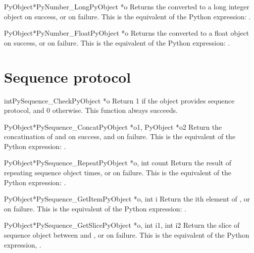 \begin{cfuncdesc}{PyObject*}{PyNumber_Long}{PyObject *o}
Returns the  converted to a long integer object on success,
or \NULL{} on failure.  This is the equivalent of the Python
expression: .
\end{cfuncdesc}


\begin{cfuncdesc}{PyObject*}{PyNumber_Float}{PyObject *o}
Returns the  converted to a float object on success, or \NULL{}
on failure.  This is the equivalent of the Python expression:
.
\end{cfuncdesc}


\section{Sequence protocol}

\begin{cfuncdesc}{int}{PySequence_Check}{PyObject *o}
Return 1 if the object provides sequence protocol, and 0
otherwise.  
This function always succeeds.
\end{cfuncdesc}


\begin{cfuncdesc}{PyObject*}{PySequence_Concat}{PyObject *o1, PyObject *o2}
Return the concatination of  and  on success, and \NULL{} on
failure.   This is the equivalent of the Python
expression: .
\end{cfuncdesc}


\begin{cfuncdesc}{PyObject*}{PySequence_Repeat}{PyObject *o, int count}
Return the result of repeating sequence object   times,
or \NULL{} on failure.  This is the equivalent of the Python
expression: .
\end{cfuncdesc}


\begin{cfuncdesc}{PyObject*}{PySequence_GetItem}{PyObject *o, int i}
Return the ith element of , or \NULL{} on failure. This is the
equivalent of the Python expression: .
\end{cfuncdesc}


\begin{cfuncdesc}{PyObject*}{PySequence_GetSlice}{PyObject *o, int i1, int i2}
Return the slice of sequence object  between  and , or
\NULL{} on failure. This is the equivalent of the Python
expression, .
\end{cfuncdesc}


